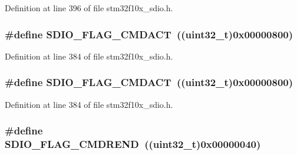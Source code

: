 Definition at line 396 of file stm32f10x\+\_\+sdio.\+h.

\subsubsection[{\texorpdfstring{S\+D\+I\+O\+\_\+\+F\+L\+A\+G\+\_\+\+C\+M\+D\+A\+CT}{SDIO_FLAG_CMDACT}}]{\setlength{\rightskip}{0pt plus 5cm}\#define S\+D\+I\+O\+\_\+\+F\+L\+A\+G\+\_\+\+C\+M\+D\+A\+CT~(({\bf uint32\+\_\+t})0x00000800)}\hypertarget{group___s_d_i_o___flags_gad12a9b2bd30e7b907cbabfd92fc645b3}{}\label{group___s_d_i_o___flags_gad12a9b2bd30e7b907cbabfd92fc645b3}


Definition at line 384 of file stm32f10x\+\_\+sdio.\+h.

\subsubsection[{\texorpdfstring{S\+D\+I\+O\+\_\+\+F\+L\+A\+G\+\_\+\+C\+M\+D\+A\+CT}{SDIO_FLAG_CMDACT}}]{\setlength{\rightskip}{0pt plus 5cm}\#define S\+D\+I\+O\+\_\+\+F\+L\+A\+G\+\_\+\+C\+M\+D\+A\+CT~(({\bf uint32\+\_\+t})0x00000800)}\hypertarget{group___s_d_i_o___flags_gad12a9b2bd30e7b907cbabfd92fc645b3}{}\label{group___s_d_i_o___flags_gad12a9b2bd30e7b907cbabfd92fc645b3}


Definition at line 384 of file stm32f10x\+\_\+sdio.\+h.

\subsubsection[{\texorpdfstring{S\+D\+I\+O\+\_\+\+F\+L\+A\+G\+\_\+\+C\+M\+D\+R\+E\+ND}{SDIO_FLAG_CMDREND}}]{\setlength{\rightskip}{0pt plus 5cm}\#define S\+D\+I\+O\+\_\+\+F\+L\+A\+G\+\_\+\+C\+M\+D\+R\+E\+ND~(({\bf uint32\+\_\+t})0x00000040)}\hypertarget{group___s_d_i_o___flags_ga083531db75a1e4c05c47578763d53af1}{}\label{group___s_d_i_o___flags_ga083531db75a1e4c05c47578763d53af1}


